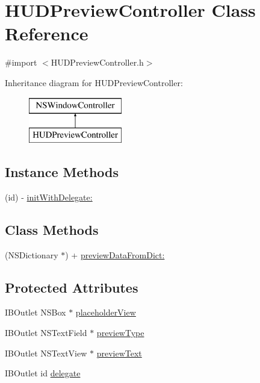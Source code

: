 \hypertarget{interface_h_u_d_preview_controller}{\section{H\-U\-D\-Preview\-Controller Class Reference}
\label{interface_h_u_d_preview_controller}
}


{\ttfamily \#import $<$H\-U\-D\-Preview\-Controller.\-h$>$}

Inheritance diagram for H\-U\-D\-Preview\-Controller\-:\begin{figure}[H]
\begin{center}
\leavevmode
\includegraphics[height=2.000000cm]{interface_h_u_d_preview_controller}
\end{center}
\end{figure}
\subsection*{Instance Methods}
\begin{DoxyCompactItemize}
\item 
(id) -\/ \hyperlink{interface_h_u_d_preview_controller_a31987d71b58e0520588676a4f6896d2c}{init\-With\-Delegate\-:}
\end{DoxyCompactItemize}
\subsection*{Class Methods}
\begin{DoxyCompactItemize}
\item 
(N\-S\-Dictionary $\ast$) + \hyperlink{interface_h_u_d_preview_controller_a2714badb1e1b4d8557c2e685285c3084}{preview\-Data\-From\-Dict\-:}
\end{DoxyCompactItemize}
\subsection*{Protected Attributes}
\begin{DoxyCompactItemize}
\item 
I\-B\-Outlet N\-S\-Box $\ast$ \hyperlink{interface_h_u_d_preview_controller_a6e541abf083c8f83993f4f037ca3de6f}{placeholder\-View}
\item 
I\-B\-Outlet N\-S\-Text\-Field $\ast$ \hyperlink{interface_h_u_d_preview_controller_a2dc3e403d5832fc8ac65e2bc88488386}{preview\-Type}
\item 
I\-B\-Outlet N\-S\-Text\-View $\ast$ \hyperlink{interface_h_u_d_preview_controller_abb17ebf9badb595d895678f2667867fb}{preview\-Text}
\item 
I\-B\-Outlet id \hyperlink{interface_h_u_d_preview_controller_a9f85cc570ea673f3b6001f8509d4bb11}{delegate}
\end{DoxyCompactItemize}
